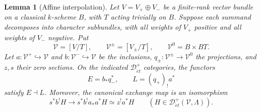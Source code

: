 \documentclass[11pt,a4paper]{article}
\newcommand{\Det}{\mathcal D_{\acute et}}
\theoremstyle{notes}
\newtheorem{blem}{Lemma}[section]
\begin{document}
\begin{blem}[Affine interpolation]\label{lem:affine}
Let $V=V_+\oplus V_-$ be a finite-rank vector bundle on a classical $k$-scheme $B$, with $T$ acting trivially on $B$. Suppose each summand decomposes into character subbundles, with all weights of $V_+$ positive and all weights of $V_-$ negative. Put
\[
\mathscr V=[V/T],\qquad
\mathscr V^\pm=[V_\pm/T],\qquad
\mathscr V^0=B\times BT.
\]
Let $a:\mathscr V^+\hookrightarrow\mathscr V$ and $b:\mathscr V^-\hookrightarrow\mathscr V$ be the inclusions, $q_\pm:\mathscr V^\pm\to\mathscr V^0$ the projections, and $z,s$ their zero sections. On the indicated $\Det^+$ categories, the functors
\[
E=b_*q_-^*,\qquad L=(q_+)_!a^*
\]
satisfy $E\dashv L$. Moreover, the canonical exchange map is an isomorphism
\begin{equation}\label{eq:linear-exchange}
s^*b^!H\longrightarrow s^*b^!a_*a^*H
\simeq z^!a^*H
\qquad(H\in\Det^+(\mathscr V,\Lambda)).
\end{equation}
\end{blem}
\end{document}
